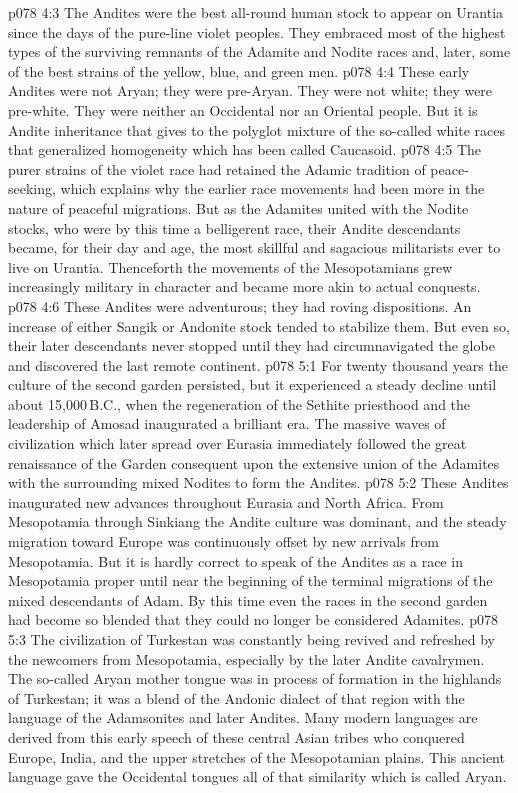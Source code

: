 \vs p078 4:3 The Andites were the best all\hyp{}round human stock to appear on Urantia since the days of the pure\hyp{}line violet peoples. They embraced most of the highest types of the surviving remnants of the Adamite and Nodite races and, later, some of the best strains of the yellow, blue, and green men.
\vs p078 4:4 \pc These early Andites were not Aryan; they were pre\hyp{}Aryan. They were not white; they were pre\hyp{}white. They were neither an Occidental nor an Oriental people. But it is Andite inheritance that gives to the polyglot mixture of the so\hyp{}called white races that generalized homogeneity which has been called Caucasoid.
\vs p078 4:5 \pc The purer strains of the violet race had retained the Adamic tradition of peace\hyp{}seeking, which explains why the earlier race movements had been more in the nature of peaceful migrations. But as the Adamites united with the Nodite stocks, who were by this time a belligerent race, their Andite descendants became, for their day and age, the most skillful and sagacious militarists ever to live on Urantia. Thenceforth the movements of the Mesopotamians grew increasingly military in character and became more akin to actual conquests.
\vs p078 4:6 These Andites were adventurous; they had roving dispositions. An increase of either Sangik or Andonite stock tended to stabilize them. But even so, their later descendants never stopped until they had circumnavigated the globe and discovered the last remote continent.
\vs p078 5:1 For twenty thousand years the culture of the second garden persisted, but it experienced a steady decline until about 15,000\,B.C., when the regeneration of the Sethite priesthood and the leadership of Amosad inaugurated a brilliant era. The massive waves of civilization which later spread over Eurasia immediately followed the great renaissance of the Garden consequent upon the extensive union of the Adamites with the surrounding mixed Nodites to form the Andites.
\vs p078 5:2 These Andites inaugurated new advances throughout Eurasia and North Africa. From Mesopotamia through Sinkiang the Andite culture was dominant, and the steady migration toward Europe was continuously offset by new arrivals from Mesopotamia. But it is hardly correct to speak of the Andites as a race in Mesopotamia proper until near the beginning of the terminal migrations of the mixed descendants of Adam. By this time even the races in the second garden had become so blended that they could no longer be considered Adamites.
\vs p078 5:3 The civilization of Turkestan was constantly being revived and refreshed by the newcomers from Mesopotamia, especially by the later Andite cavalrymen. The so\hyp{}called Aryan mother tongue was in process of formation in the highlands of Turkestan; it was a blend of the Andonic dialect of that region with the language of the Adamsonites and later Andites. Many modern languages are derived from this early speech of these central Asian tribes who conquered Europe, India, and the upper stretches of the Mesopotamian plains. This ancient language gave the Occidental tongues all of that similarity which is called Aryan.
